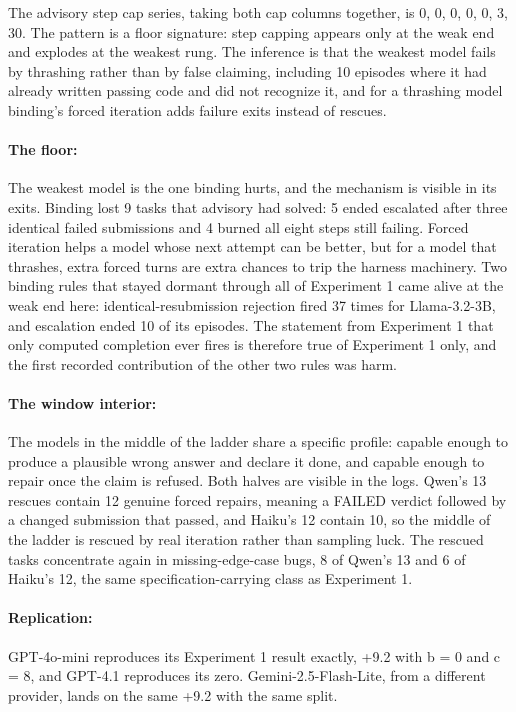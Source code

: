 The advisory step cap series, taking both cap columns together, is 0, 0, 0, 0, 0, 3, 30. The pattern is a floor signature: step capping appears only at the weak end and explodes at the weakest rung. The inference is that the weakest model fails by thrashing rather than by false claiming, including 10 episodes where it had already written passing code and did not recognize it, and for a thrashing model binding's forced iteration adds failure exits instead of rescues.

\paragraph{The floor:} The weakest model is the one binding hurts, and the mechanism is visible in its exits. Binding lost 9 tasks that advisory had solved: 5 ended escalated after three identical failed submissions and 4 burned all eight steps still failing. Forced iteration helps a model whose next attempt can be better, but for a model that thrashes, extra forced turns are extra chances to trip the harness machinery. Two binding rules that stayed dormant through all of Experiment 1 came alive at the weak end here: identical-resubmission rejection fired 37 times for Llama-3.2-3B, and escalation ended 10 of its episodes. The statement from Experiment 1 that only computed completion ever fires is therefore true of Experiment 1 only, and the first recorded contribution of the other two rules was harm.

\paragraph{The window interior:} The models in the middle of the ladder share a specific profile: capable enough to produce a plausible wrong answer and declare it done, and capable enough to repair once the claim is refused. Both halves are visible in the logs. Qwen's 13 rescues contain 12 genuine forced repairs, meaning a FAILED verdict followed by a changed submission that passed, and Haiku's 12 contain 10, so the middle of the ladder is rescued by real iteration rather than sampling luck. The rescued tasks concentrate again in missing-edge-case bugs, 8 of Qwen's 13 and 6 of Haiku's 12, the same specification-carrying class as Experiment 1.

\paragraph{Replication:} GPT-4o-mini reproduces its Experiment 1 result exactly, +9.2 with b = 0 and c = 8, and GPT-4.1 reproduces its zero. Gemini-2.5-Flash-Lite, from a different provider, lands on the same +9.2 with the same split.

